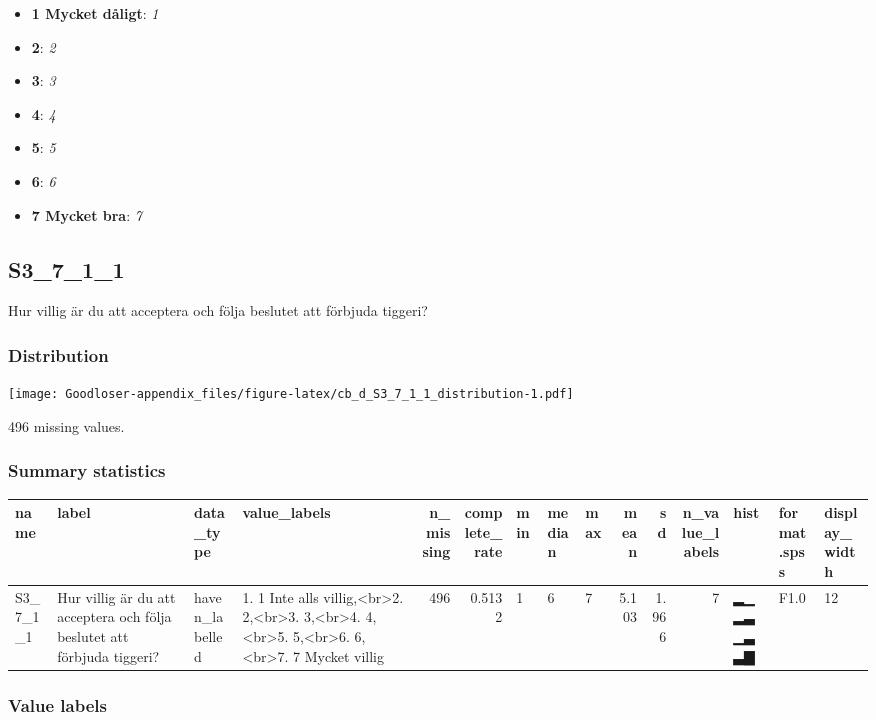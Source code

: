 \documentclass[
]{book}
\providecommand{\tightlist}{%
  \setlength{\itemsep}{0pt}\setlength{\parskip}{0pt}}
\begin{document}
\begin{itemize}
\tightlist
\item
  \textbf{1 Mycket dåligt}: \emph{1}
\item
  \textbf{2}: \emph{2}
\item
  \textbf{3}: \emph{3}
\item
  \textbf{4}: \emph{4}
\item
  \textbf{5}: \emph{5}
\item
  \textbf{6}: \emph{6}
\item
  \textbf{7 Mycket bra}: \emph{7}
\end{itemize}

\hypertarget{S3_7_1_1}{%
\subsection{S3\_7\_1\_1}\label{S3_7_1_1}}

Hur villig är du att acceptera och följa beslutet att förbjuda tiggeri?

\hypertarget{S3_7_1_1_distribution}{%
\subsubsection{Distribution}\label{S3_7_1_1_distribution}}

\texttt{[image: Goodloser-appendix\_files/figure-latex/cb\_d\_S3\_7\_1\_1\_distribution-1.pdf]}

496 missing values.

\hypertarget{S3_7_1_1_summary}{%
\subsubsection{Summary statistics}\label{S3_7_1_1_summary}}

\begin{tabular}{l|l|l|l|r|r|l|l|l|r|r|r|l|l|l}
\hline
name & label & data_type & value_labels & n_missing & complete_rate & min & median & max & mean & sd & n_value_labels & hist & format.spss & display_width\\
\hline
S3_7_1_1 & Hur villig är du att acceptera och följa beslutet att förbjuda tiggeri? & haven_labelled & 1. 1 Inte alls villig,<br>2. 2,<br>3. 3,<br>4. 4,<br>5. 5,<br>6. 6,<br>7. 7 Mycket villig & 496 & 0.5132 & 1 & 6 & 7 & 5.103 & 1.966 & 7 & ▂▁▂▃▁▃▃▇ & F1.0 & 12\\
\hline
\end{tabular}

\hypertarget{S3_7_1_1_labels}{%
\subsubsection{Value labels}\label{S3_7_1_1_labels}}
\end{document}
